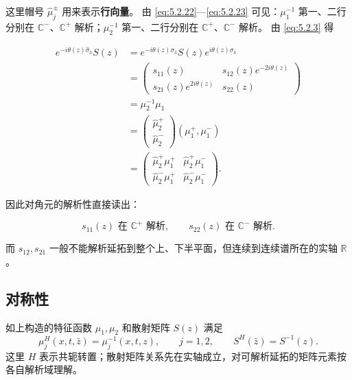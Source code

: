 \documentclass[
    lang=cn,
    scheme=chinese,
    mode=simple,
    device=normal,
    color=blue,
    math=cm,
    thmcnt=section,
    12pt
]{elegantbook}
\begin{document}
这里帽号 $\widehat\mu_j^\pm$ 用来表示\textbf{行向量}。
由 \eqref{eq:5.2.22}---\eqref{eq:5.2.23} 可见：$\mu_1^{-1}$ 第一、二行分别在 $\mathbb{C}^-$、$\mathbb{C}^+$ 解析；$\mu_2^{-1}$ 第一、二行分别在 $\mathbb{C}^+$、$\mathbb{C}^-$ 解析。
由 \eqref{eq:5.2.3} 得

\[
    \begin{aligned}
        e^{-i\theta(z)\widehat{\sigma}_3}S(z)
        & =
        e^{-i\theta(z)\sigma_3}S(z)e^{i\theta(z)\sigma_3} \\
        & =
        \begin{pmatrix}
            s_{11}(z) & s_{12}(z)e^{-2i\theta(z)} \\
            s_{21}(z)e^{2i\theta(z)} & s_{22}(z)
        \end{pmatrix} \\
        & =
        \mu_2^{-1}\mu_1 \\
        & =
        \begin{pmatrix}
            \widehat\mu_2^+ \\
            \widehat\mu_2^-
        \end{pmatrix}
        (\mu_1^+,\mu_1^-) \\
        & =
        \begin{pmatrix}
            \widehat\mu_2^+\mu_1^+ & \widehat\mu_2^+\mu_1^- \\
            \widehat\mu_2^-\mu_1^+ & \widehat\mu_2^-\mu_1^-
        \end{pmatrix}.
    \end{aligned}
\]

因此对角元的解析性直接读出：

\[
    s_{11}(z)\text{ 在 }\mathbb{C}^+\text{ 解析},
    \qquad
    s_{22}(z)\text{ 在 }\mathbb{C}^-\text{ 解析}.
\]

而 $s_{12},s_{21}$ 一般不能解析延拓到整个上、下半平面，但连续到连续谱所在的实轴 $\mathbb{R}$。

\subsection{对称性}

\setcounter{theorem}{0}
\begin{theorem}[特征函数与散射矩阵的共轭对称]
如上构造的特征函数 $\mu_1,\mu_2$ 和散射矩阵 $S(z)$ 满足
\[
\mu_j^H(x,t,\bar z)=\mu_j^{-1}(x,t,z),\qquad j=1,2,\qquad S^H(\bar z)=S^{-1}(z).
\]
这里 $H$ 表示共轭转置；散射矩阵关系先在实轴成立，对可解析延拓的矩阵元素按各自解析域理解。
\end{theorem}
\end{document}

